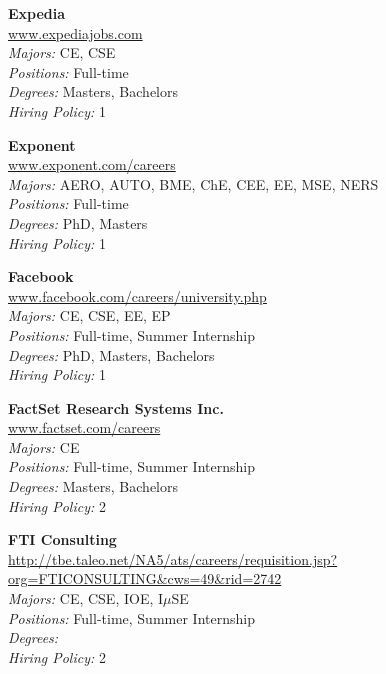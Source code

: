 \documentclass[twoside]{article}
\begin{document}
\begin{center}
\begin{multicols}{3}
\begin{minipage}{.9\columnwidth}{\Large\bf Expedia }\\
	\url{www.expediajobs.com}\\
	\emph{Majors:} CE, CSE\\
	\emph{Positions:} Full-time\\
	\emph{Degrees:} Masters, Bachelors\\
	\emph{Hiring Policy:} 1\\
\end{minipage}
 
\begin{minipage}{.9\columnwidth}{\Large\bf Exponent }\\
	\url{www.exponent.com/careers}\\
	\emph{Majors:} AERO, AUTO, BME, ChE, CEE, EE, MSE, NERS\\
	\emph{Positions:} Full-time\\
	\emph{Degrees:} PhD, Masters\\
	\emph{Hiring Policy:} 1\\
\end{minipage}
 
\begin{minipage}{.9\columnwidth}{\Large\bf Facebook }\\
	\url{www.facebook.com/careers/university.php}\\
	\emph{Majors:} CE, CSE, EE, EP\\
	\emph{Positions:} Full-time, Summer Internship\\
	\emph{Degrees:} PhD, Masters, Bachelors\\
	\emph{Hiring Policy:} 1\\
\end{minipage}
 
\begin{minipage}{.9\columnwidth}{\Large\bf FactSet Research Systems Inc. }\\
	\url{www.factset.com/careers}\\
	\emph{Majors:} CE\\
	\emph{Positions:} Full-time, Summer Internship\\
	\emph{Degrees:} Masters, Bachelors\\
	\emph{Hiring Policy:} 2\\
\end{minipage}
 
\begin{minipage}{.9\columnwidth}{\Large\bf FTI Consulting }\\
	\url{http://tbe.taleo.net/NA5/ats/careers/requisition.jsp?org=FTICONSULTING&cws=49&rid=2742}\\
	\emph{Majors:} CE, CSE, IOE, I$\mu$SE\\
	\emph{Positions:} Full-time, Summer Internship\\
	\emph{Degrees:} \\
	\emph{Hiring Policy:} 2\\
\end{minipage}
 

\end{multicols}
\end{center}
\end{document}
